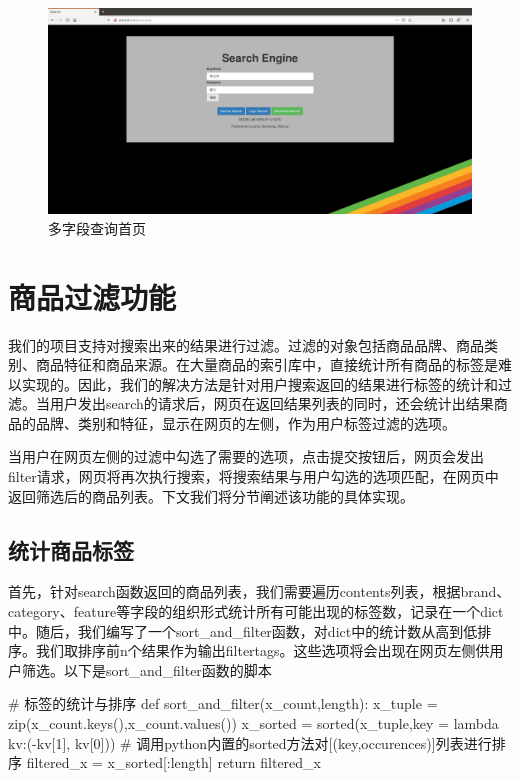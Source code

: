\begin{figure}[htbp]
\centering
\includegraphics[width=13.5cm]{img/zlt/searchidx3.png}
\caption{多字段查询首页}
\label{fig:zlt_index3}
\end{figure}

\section{商品过滤功能}

我们的项目支持对搜索出来的结果进行过滤。过滤的对象包括商品品牌、商品类别、商品特征和商品来源。在大量商品的索引库中，直接统计所有商品的标签是难以实现的。因此，我们的解决方法是针对用户搜索返回的结果进行标签的统计和过滤。当用户发出search的请求后，网页在返回结果列表的同时，还会统计出结果商品的品牌、类别和特征，显示在网页的左侧，作为用户标签过滤的选项。

当用户在网页左侧的过滤中勾选了需要的选项，点击提交按钮后，网页会发出filter请求，网页将再次执行搜索，将搜索结果与用户勾选的选项匹配，在网页中返回筛选后的商品列表。下文我们将分节阐述该功能的具体实现。


\subsection{统计商品标签}

首先，针对search函数返回的商品列表，我们需要遍历contents列表，根据brand、category、feature等字段的组织形式统计所有可能出现的标签数，记录在一个dict中。随后，我们编写了一个sort\_and\_filter函数，对dict中的统计数从高到低排序。我们取排序前n个结果作为输出filtertags。这些选项将会出现在网页左侧供用户筛选。以下是sort\_and\_filter函数的脚本


\begin{python}
# 标签的统计与排序
def sort_and_filter(x_count,length):
    x_tuple = zip(x_count.keys(),x_count.values())
    x_sorted = sorted(x_tuple,key = lambda kv:(-kv[1], kv[0]))
    # 调用python内置的sorted方法对[(key,occurences)]列表进行排序
    filtered_x = x_sorted[:length]
    return filtered_x
\end{python}

